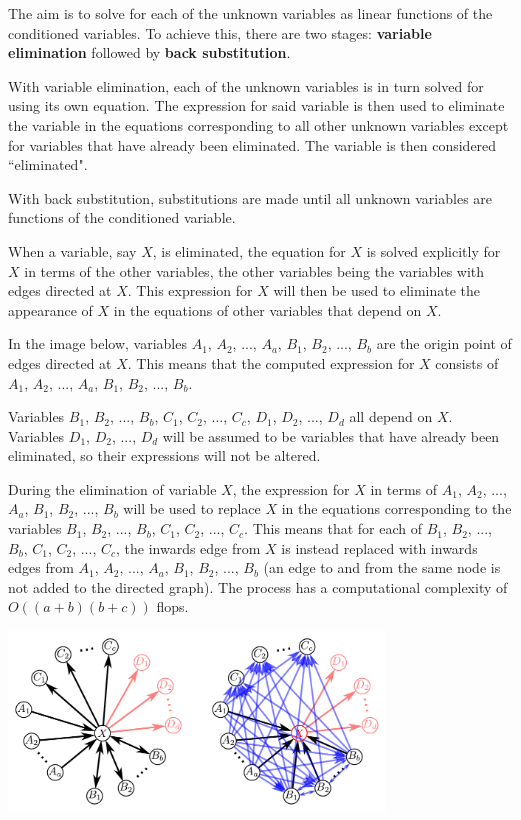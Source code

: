 \documentclass{article}
\begin{document}
The aim is to solve for each of the unknown variables as linear functions of the conditioned variables. To achieve this, there are two stages: {\bf variable elimination} followed by {\bf back substitution}. 

With variable elimination, each of the unknown variables is in turn solved for using its own equation. The expression for said variable is then used to eliminate the variable in the equations corresponding to all other unknown variables except for variables that have already been eliminated. The variable is then considered ``eliminated". 

With back substitution, substitutions are made until all unknown variables are functions of the conditioned variable.   

When a variable, say \(X\), is eliminated, the equation for \(X\) is solved explicitly for \(X\) in terms of the other variables, the other variables being the variables with edges directed at \(X\). This expression for \(X\) will then be used to eliminate the appearance of \(X\) in the equations of other variables that depend on \(X\).   

In the image below, variables \(A_1\), \(A_2\), ..., \(A_a\), \(B_1\), \(B_2\), ..., \(B_b\) are the origin point of edges directed at \(X\). This means that the computed expression for \(X\) consists of \(A_1\), \(A_2\), ..., \(A_a\), \(B_1\), \(B_2\), ..., \(B_b\). 

Variables \(B_1\), \(B_2\), ..., \(B_b\), \(C_1\), \(C_2\), ..., \(C_c\), \(D_1\), \(D_2\), ..., \(D_d\) all depend on \(X\). Variables \(D_1\), \(D_2\), ..., \(D_d\) will be assumed to be variables that have already been eliminated, so their expressions will not be altered. 

During the elimination of variable \(X\), the expression for \(X\) in terms of \(A_1\), \(A_2\), ..., \(A_a\), \(B_1\), \(B_2\), ..., \(B_b\) will be used to replace \(X\) in the equations corresponding to the variables \(B_1\), \(B_2\), ..., \(B_b\), \(C_1\), \(C_2\), ..., \(C_c\). This means that for each of \(B_1\), \(B_2\), ..., \(B_b\), \(C_1\), \(C_2\), ..., \(C_c\), the inwards edge from \(X\) is instead replaced with inwards edges from \(A_1\), \(A_2\), ..., \(A_a\), \(B_1\), \(B_2\), ..., \(B_b\) (an edge to and from the same node is not added to the directed graph). The process has a computational complexity of \(O((a + b)(b + c))\) flops.

\begin{center} 
\includegraphics[width = 0.75\textwidth]{variable_mesh_elimination}
\end{center}
\end{document}
